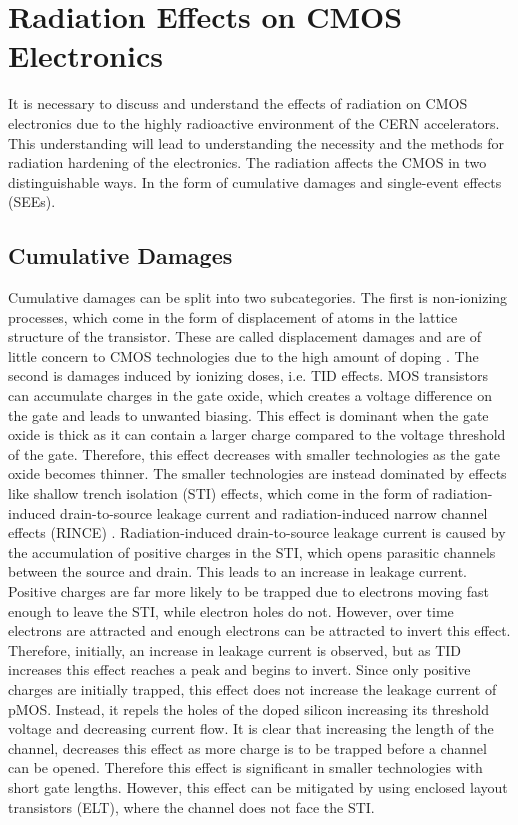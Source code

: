 \section{Radiation Effects on CMOS Electronics}
\label{rad_effect_cmos}
It is necessary to discuss and understand the effects of radiation on CMOS electronics due to the highly radioactive environment of the CERN accelerators. This understanding will lead to understanding the necessity and the methods for radiation hardening of the electronics. The radiation affects the CMOS in two distinguishable ways. In the form of cumulative damages and single-event effects (SEEs). 

\subsection{Cumulative Damages}
Cumulative damages can be split into two subcategories. The first is non-ionizing processes, which come in the form of displacement of atoms in the lattice structure of the transistor. These are called displacement damages and are of little concern to CMOS technologies due to the high amount of doping \cite{giulioThesis}. The second is damages induced by ionizing doses, i.e. TID effects. MOS transistors can accumulate charges in the gate oxide, which creates a voltage difference on the gate and leads to unwanted biasing. This effect is dominant when the gate oxide is thick as it can contain a larger charge compared to the voltage threshold of the gate. Therefore, this effect decreases with smaller technologies as the gate oxide becomes thinner. The smaller technologies are instead dominated by effects like shallow trench isolation (STI) effects, which come in the form of radiation-induced drain-to-source leakage current and radiation-induced narrow channel effects (RINCE) \cite{giulioThesis}. Radiation-induced drain-to-source leakage current is caused by the accumulation of positive charges in the STI, which opens parasitic channels between the source and drain. This leads to an increase in leakage current. Positive charges are far more likely to be trapped due to electrons moving fast enough to leave the STI, while electron holes do not. However, over time electrons are attracted and enough electrons can be attracted to invert this effect. Therefore, initially, an increase in leakage current is observed, but as TID increases this effect reaches a peak and begins to invert. Since only positive charges are initially trapped, this effect does not increase the leakage current of pMOS. Instead, it repels the holes of the doped silicon increasing its threshold voltage and decreasing current flow. It is clear that increasing the length of the channel, decreases this effect as more charge is to be trapped before a channel can be opened. Therefore this effect is significant in smaller technologies with short gate lengths. However, this effect can be mitigated by using enclosed layout transistors (ELT), where the channel does not face the STI. 

